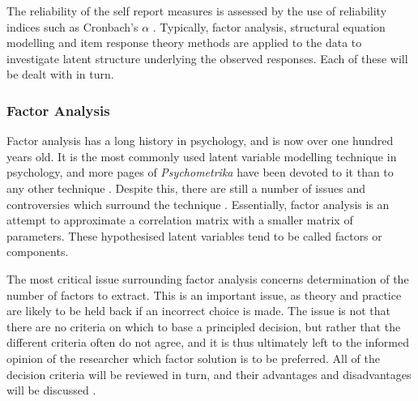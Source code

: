 The reliability of the self report measures is assessed by the use of reliability indices such as Cronbach's $\alpha$ \cite{cronbach1951coefficient}. Typically,  factor analysis, structural equation modelling and item response theory methods are applied to the data to investigate latent structure underlying the observed responses. Each of these will be dealt with in turn.  



\subsubsection{Factor Analysis}
\label{sec:factor-analysis}
Factor analysis has a long history in psychology, and is now over one hundred years old. It is the most commonly used latent variable modelling technique in psychology, and more pages of \textit{Psychometrika} have been devoted to it than to any other technique \cite{henson2006use}.  Despite this, there are still a number of issues and controversies which surround the technique \cite{sass2010comparative}.  Essentially, factor analysis is an attempt to approximate a correlation matrix with a smaller matrix of parameters.  These hypothesised latent variables tend to be called factors or components.



The most critical issue surrounding factor analysis concerns determination of the number of factors to extract\cite{zwick1986comparison}.  This is an important issue, as theory and practice are likely to be held back if an incorrect choice is made.  The issue is not that there are no criteria on which to base a principled decision, but rather that the different criteria often do not agree, and it is thus ultimately left to the informed opinion of the researcher which factor solution is to be preferred.  All of the decision criteria will be reviewed in turn, and their advantages and disadvantages will be discussed \cite{henson2006use}. 

